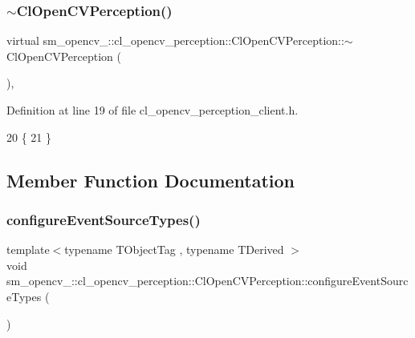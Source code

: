 \subsubsection{\texorpdfstring{$\sim$\+Cl\+Open\+C\+V\+Perception()}{~ClOpenCVPerception()}}
{\footnotesize\ttfamily virtual sm\+\_\+opencv\+\_\+::cl\+\_\+opencv\+\_\+perception\+::\+Cl\+Open\+C\+V\+Perception\+::$\sim$\+Cl\+Open\+C\+V\+Perception (\begin{DoxyParamCaption}{ }\end{DoxyParamCaption})\hspace{0.3cm}{\ttfamily [inline]}, {\ttfamily [virtual]}}



Definition at line 19 of file cl\+\_\+opencv\+\_\+perception\+\_\+client.\+h.


\begin{DoxyCode}
20   \{
21   \}
\end{DoxyCode}


\subsection{Member Function Documentation}
\mbox{\label{classsm__opencv__3_1_1cl__opencv__perception_1_1ClOpenCVPerception_accd30f3e411c1c289826c27f4f653c49}} 
\subsubsection{\texorpdfstring{configure\+Event\+Source\+Types()}{configureEventSourceTypes()}}
{\footnotesize\ttfamily template$<$typename T\+Object\+Tag , typename T\+Derived $>$ \\
void sm\+\_\+opencv\+\_\+::cl\+\_\+opencv\+\_\+perception\+::\+Cl\+Open\+C\+V\+Perception\+::configure\+Event\+Source\+Types (\begin{DoxyParamCaption}{ }\end{DoxyParamCaption})\hspace{0.3cm}{\ttfamily [inline]}}



